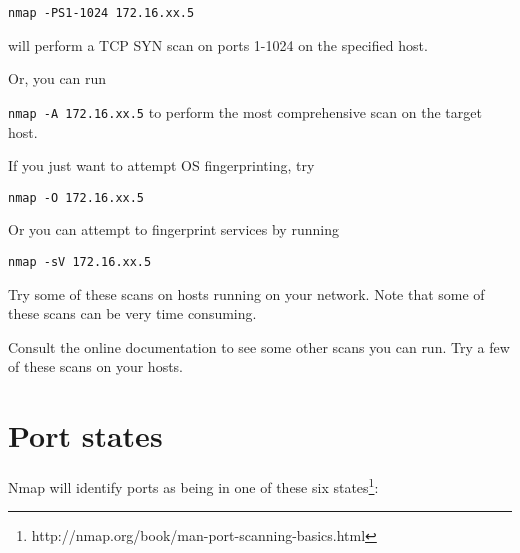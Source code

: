 \documentclass{article}
\begin{document}
\texttt{nmap -PS1-1024 172.16.xx.5} 

will perform a TCP SYN scan on ports 1-1024 on the specified host.

Or, you can run 

\texttt{nmap -A 172.16.xx.5} to perform the most comprehensive scan on the 
target host.

If you just want to attempt OS fingerprinting, try 

\texttt{nmap -O 172.16.xx.5}

Or you can attempt to fingerprint services by running

\texttt{nmap -sV 172.16.xx.5}


Try some of these scans on hosts running on your network.  Note that some of these scans can be very time consuming.

Consult the online documentation to see some other scans you can run. Try a few of these scans on your hosts.

\section{Port states}
Nmap will identify ports as being in one of these six states\footnote{http://nmap.org/book/man-port-scanning-basics.html}:
\end{document}
